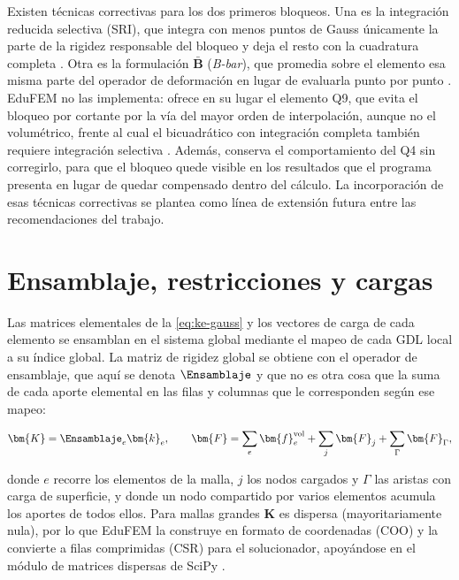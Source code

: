 Existen técnicas correctivas para los dos primeros bloqueos. Una es la integración reducida selectiva (SRI), que integra con menos puntos de Gauss únicamente la parte de la rigidez responsable del bloqueo y deja el resto con la cuadratura completa \autocites[p.~221]{hughes2000fem}[pp.~476-477]{bathe2014fem}. Otra es la formulación $\bar{\bm{B}}$ (\emph{B-bar}), que promedia sobre el elemento esa misma parte del operador de deformación en lugar de evaluarla punto por punto \autocite[pp.~232-234]{hughes2000fem}. EduFEM no las implementa: ofrece en su lugar el elemento Q9, que evita el bloqueo por cortante por la vía del mayor orden de interpolación, aunque no el volumétrico, frente al cual el bicuadrático con integración completa también requiere integración selectiva \autocite[p.~222]{hughes2000fem}. Además, conserva el comportamiento del Q4 sin corregirlo, para que el bloqueo quede visible en los resultados que el programa presenta en lugar de quedar compensado dentro del cálculo. La incorporación de esas técnicas correctivas se plantea como línea de extensión futura entre las recomendaciones del trabajo.

\section{Ensamblaje, restricciones y cargas}
\label{sec:ensamblaje}

Las matrices elementales de la \autoref{eq:ke-gauss} y los vectores de carga de cada elemento se ensamblan en el sistema global mediante el mapeo de cada GDL local a su índice global. La matriz de rigidez global se obtiene con el operador de ensamblaje, que aquí se denota $\Ensamblaje$ y que no es otra cosa que la suma de cada aporte elemental en las filas y columnas que le corresponden según ese mapeo:

\begin{equation}
\bm{K} = \Ensamblaje_{e} \bm{k}_e, \qquad
\bm{F} = \sum_e \bm{f}_e^{\text{vol}} + \sum_j \bm{F}_j + \sum_\Gamma \bm{F}_\Gamma,
\label{eq:ensamblaje}
\end{equation}

donde $e$ recorre los elementos de la malla, $j$ los nodos cargados y $\Gamma$ las aristas con carga de superficie, y donde un nodo compartido por varios elementos acumula los aportes de todos ellos. Para mallas grandes $\bm{K}$ es dispersa (mayoritariamente nula), por lo que EduFEM la construye en formato de coordenadas (COO) y la convierte a filas comprimidas (CSR) para el solucionador, apoyándose en el módulo de matrices dispersas de SciPy \autocite[p.~265]{virtanen2020scipy}.


